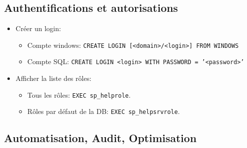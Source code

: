 \documentclass[a4paper]{article}
\begin{document}
\subsection{Authentifications et autorisations}





\begin{itemize}


\item Créer un login:
\begin{itemize}
    \item Compte windows: \texttt{CREATE LOGIN [<domain>/<login>] FROM WINDOWS}
    \item Compte SQL: \texttt{CREATE LOGIN <login> WITH PASSWORD = '<password>'}
\end{itemize}


\item Afficher la liste des rôles:
\begin{itemize}
    \item Tous les rôles: \texttt{EXEC sp\_helprole}.
    \item Rôles par défaut de la DB: \texttt{EXEC sp\_helpsrvrole}.
\end{itemize}


\end{itemize}










\subsection{Automatisation, Audit, Optimisation}
\end{document}

